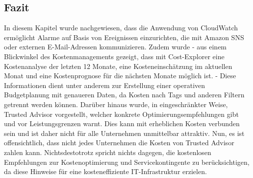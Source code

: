 \subsection*{Fazit}
In diesem Kapitel wurde nachgewiesen, dass die Anwendung von CloudWatch ermöglicht Alarme auf Basis von Ereignissen einzurichten, die mit Amazon SNS oder externen E-Mail-Adressen kommunizieren. %
Zudem wurde - aus einem Blickwinkel des Kostenmanagements gezeigt, dass mit Cost-Explorer eine Kostenanalyse der letzten 12 Monate, eine Kosteneinschätzung im aktuellen Monat und eine Kostenprognose für die nächsten Monate möglich ist. - Diese Informationen dient unter anderem zur Erstellung einer operativen Budgetplanung mit genaueren Daten, da
Kosten nach Tags und anderen Filtern getrennt werden können.
Darüber hinaus wurde, in eingeschränkter Weise, Trusted Advisor vorgestellt, welcher konkrete Optimierungsempfehlungen gibt und vor Leistungsgrenzen warnt. Dies kann mit erheblichen Kosten verbunden sein und ist daher nicht für alle Unternehmen unmittelbar attraktiv. Nun, es ist offensichtlich, dass nicht jedes Unternehmen die Kosten von Trusted Advisor zahlen kann. Nichtsdestotrotz spricht nichts dagegen, die kostenlosen Empfehlungen zur Kostenoptimierung und Servicekontingente zu berücksichtigen, da diese Hinweise für eine kosteneffiziente IT-Infrastruktur erzielen.


